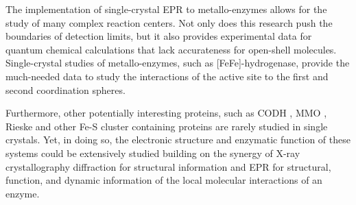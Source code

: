 The implementation of single-crystal EPR to metallo-enzymes allows for the study of many complex reaction centers. \cite{holm2014introduction} Not only does this research push the boundaries of detection limits, but it also provides experimental data for quantum chemical calculations that lack accurateness for open-shell molecules. Single-crystal studies of metallo-enzymes, such as [FeFe]-hydrogenase, provide the much-needed data to study the interactions of the active site to the first and second coordination spheres. 

Furthermore, other potentially interesting proteins, such as CODH \cite{C5CS00182J}, MMO \cite{Hoffman2014rev}, Rieske \cite{FERRARO2005175} and other Fe-S cluster containing proteins \cite{FeSClustersReview} are rarely studied in single crystals. Yet, in doing so, the electronic structure and enzymatic function of these systems could be extensively studied building on the synergy of X-ray crystallography diffraction for structural information and EPR for structural, function, and dynamic information of the local molecular interactions of an enzyme.  


{\renewcommand{\bibsection}{\clearpage\section*{\bibname}\markboth{\bibname}{\bibname}}
\renewcommand{\bibname}{CHAPTER 7. REFERENCES}


}